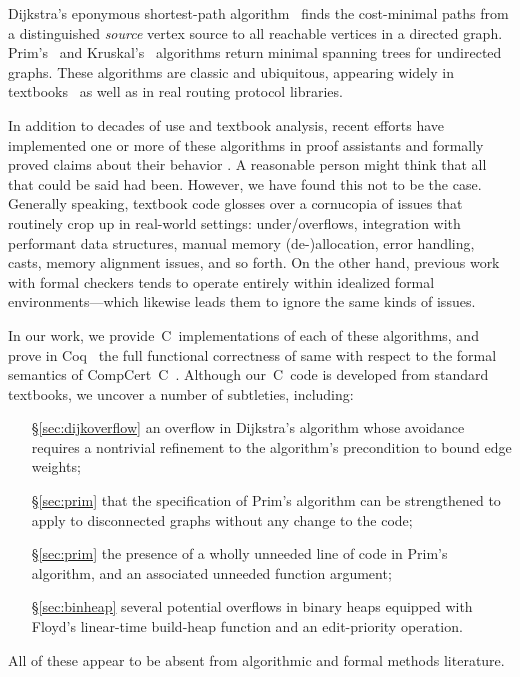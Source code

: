 Dijkstra's eponymous shortest-path algorithm~\cite{DBLP:journals/nm/Dijkstra59} finds
the cost-minimal paths from a distinguished \emph{source} vertex
source to all reachable vertices in a directed graph. Prim's~\cite{prim} and Kruskal's~\cite{kruskal} algorithms return minimal spanning trees for undirected graphs.
These algorithms are classic and ubiquitous, appearing widely in textbooks~\cite{clrs,DBLP:books/daglib/0022194,heineman2008algorithms,rozen,kepnergilbert,sedgewick} as well as in real routing protocol libraries.

In addition to decades of use and textbook analysis, recent efforts have implemented one or more of these algorithms in proof
assistants and formally proved claims about their behavior \cite{Mizar,ACL2,Coq,cite,cite,cite}.  A reasonable person might think that all
that could be said had been.  However, we have found this not to be the case.  Generally speaking, textbook code glosses over a cornucopia
of issues that routinely crop up in real-world settings: under/overflows, integration with performant data structures, manual memory (de-)allocation,
error handling, casts, memory alignment issues, and so forth.  On the other hand, previous work with formal checkers tends to operate entirely
within idealized formal environments---which likewise leads them to ignore the same kinds of issues.

In our work, we provide~C~implementations of each of these algorithms, and prove in Coq~\cite{coq} the full functional correctness of same with respect to
the formal semantics of CompCert~C~\cite{leroy:compcert}.  Although our~C~code is developed from standard textbooks, we uncover a number of subtleties, including:
\begin{itemize}
\item[\S\ref{sec:dijkoverflow}] an overflow in Dijkstra's algorithm whose avoidance requires a nontrivial refinement to the algorithm's precondition to bound edge weights;
\item[\S\ref{sec:prim}] that the specification of Prim's algorithm can be strengthened to apply to disconnected graphs without any change to the code;
\item[\S\ref{sec:prim}] the presence of a wholly unneeded line of code in Prim's algorithm, and an associated unneeded function argument;
\item[\S\ref{sec:binheap}] several potential overflows in binary heaps equipped with Floyd's linear-time build-heap function and an edit-priority operation.
\end{itemize}
All of these appear to be absent from algorithmic and formal methods literature.

